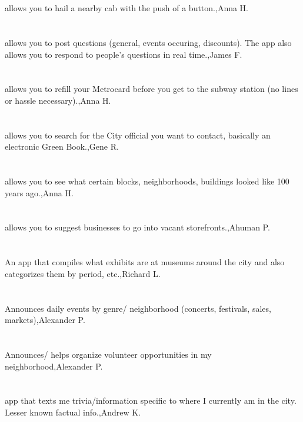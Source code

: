 \section{}allows you to hail a nearby cab with the push of a button.,Anna H.	
\section{}allows you to post questions (general, events occuring, discounts). The app also allows you to respond to people's questions in real time.,James F.	
\section{}allows you to refill your Metrocard before you get to the subway station (no lines or hassle necessary).,Anna H.	
\section{}allows you to search for the City official you want to contact, basically an electronic Green Book.,Gene R.	
\section{}allows you to see what certain blocks, neighborhoods, buildings looked like 100 years ago.,Anna H.	
\section{}allows you to suggest businesses to go into vacant storefronts.,Ahuman P.	
\section{}An app that compiles what exhibits are at museums around the city and also categorizes them by period, etc.,Richard L.	
\section{}Announces daily events by genre/ neighborhood (concerts, festivals, sales, markets),Alexander P.	
\section{}Announces/ helps organize volunteer opportunities in my neighborhood,Alexander P.	
\section{}app that texts me trivia/information specific to where I currently am in the city.  Lesser known factual info.,Andrew K.
